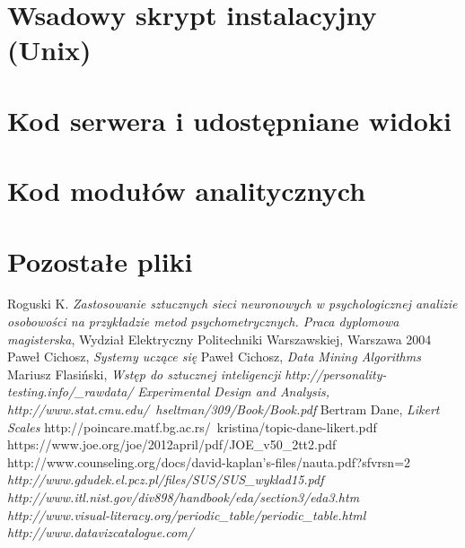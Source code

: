 \documentclass[12pt,a4paper,oneside]{report} %
\begin{document}
\section{Wsadowy skrypt instalacyjny (Unix)}
%
%
\section{Kod serwera i udostępniane widoki}
%
%
%
%
%
%
%
%
\section{Kod modułów analitycznych}
\section{Pozostałe pliki}

\begin{thebibliography}{9}
 Roguski K. \emph{Zastosowanie sztucznych sieci neuronowych w psychologicznej analizie osobowości na przykładzie metod psychometrycznych. Praca dyplomowa magisterska}, Wydział Elektryczny Politechniki Warszawskiej, Warszawa 2004
 Paweł Cichosz, \emph{Systemy uczące się}
 Paweł Cichosz, \emph{Data Mining Algorithms}
 Mariusz Flasiński, \emph{Wstęp do sztucznej inteligencji}
 \emph{http://personality-testing.info/_rawdata/}
 \emph{Experimental Design and Analysis, http://www.stat.cmu.edu/~hseltman/309/Book/Book.pdf}
 Bertram Dane, \emph{Likert Scales} http://poincare.matf.bg.ac.rs/~kristina/topic-dane-likert.pdf
   https://www.joe.org/joe/2012april/pdf/JOE_v50_2tt2.pdf
 http://www.counseling.org/docs/david-kaplan's-files/nauta.pdf?sfvrsn=2
 \emph{http://www.gdudek.el.pcz.pl/files/SUS/SUS_wyklad15.pdf}
 \emph{http://www.itl.nist.gov/div898/handbook/eda/section3/eda3.htm}
 \emph{http://www.visual-literacy.org/periodic_table/periodic_table.html}
 \emph{http://www.datavizcatalogue.com/}
\end{thebibliography}
\end{document}
